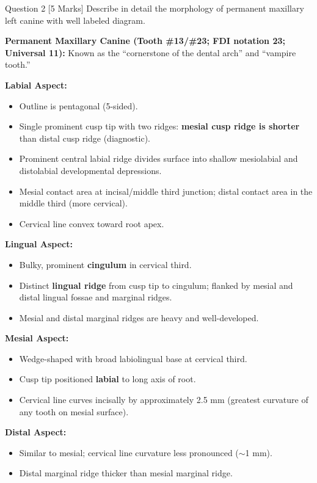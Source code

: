 \documentclass[11pt,a4paper]{article}
\begin{document}
\begin{qbox}{Question 2 [5 Marks]}
Describe in detail the morphology of permanent maxillary left canine with well labeled diagram.
\end{qbox}

\begin{ansbox}
\textbf{Permanent Maxillary Canine (Tooth \#13/\#23; FDI notation 23; Universal 11):} Known as the ``cornerstone of the dental arch'' and ``vampire tooth.''

\textbf{Labial Aspect:}
\begin{itemize}[leftmargin=*]
    \item Outline is pentagonal (5-sided).
    \item Single prominent cusp tip with two ridges: \textbf{mesial cusp ridge is shorter} than distal cusp ridge (diagnostic).
    \item Prominent central labial ridge divides surface into shallow mesiolabial and distolabial developmental depressions.
    \item Mesial contact area at incisal/middle third junction; distal contact area in the middle third (more cervical).
    \item Cervical line convex toward root apex.
\end{itemize}

\textbf{Lingual Aspect:}
\begin{itemize}[leftmargin=*]
    \item Bulky, prominent \textbf{cingulum} in cervical third.
    \item Distinct \textbf{lingual ridge} from cusp tip to cingulum; flanked by mesial and distal lingual fossae and marginal ridges.
    \item Mesial and distal marginal ridges are heavy and well-developed.
\end{itemize}

\textbf{Mesial Aspect:}
\begin{itemize}[leftmargin=*]
    \item Wedge-shaped with broad labiolingual base at cervical third.
    \item Cusp tip positioned \textbf{labial} to long axis of root.
    \item Cervical line curves incisally by approximately 2.5 mm (greatest curvature of any tooth on mesial surface).
\end{itemize}

\textbf{Distal Aspect:}
\begin{itemize}[leftmargin=*]
    \item Similar to mesial; cervical line curvature less pronounced ($\sim$1 mm).
    \item Distal marginal ridge thicker than mesial marginal ridge.
\end{itemize}


\end{ansbox}
\end{document}
